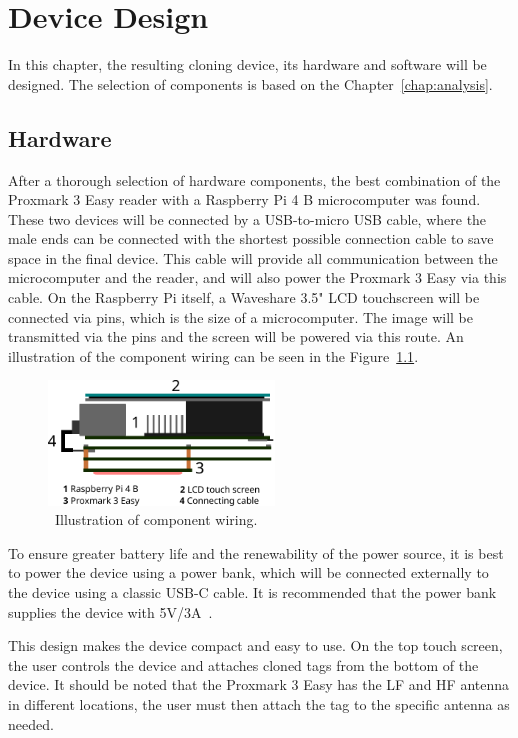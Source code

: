 \chapter{Device Design}
\label{chap:design}


In this chapter, the resulting cloning device, its hardware and software will be designed. The selection of components is based on the Chapter~\ref{chap:analysis}.

\section{Hardware}

After a thorough selection of hardware components, the best combination of the Proxmark 3 Easy reader with a Raspberry Pi 4 B microcomputer was found. These two devices will be connected by a USB-to-micro USB cable, where the male ends can be connected with the shortest possible connection cable to save space in the final device. This cable will provide all communication between the microcomputer and the reader, and will also power the Proxmark 3 Easy via this cable. On the Raspberry Pi itself, a Waveshare 3.5" LCD touchscreen will be connected via pins, which is the size of a microcomputer. The image will be transmitted via the pins and the screen will be powered via this route. An illustration of the component wiring can be seen in the Figure~\ref{fig:devicescheme}. 


\begin{figure}[ht]
  \centering
  \includegraphics[width=6cm]{text/device_scheme.pdf}
  \caption[Illustration of component wiring.]{~Illustration of component wiring.}
  \label{fig:devicescheme}
\end{figure}

To ensure greater battery life and the renewability of the power source, it is best to power the device using a power bank, which will be connected externally to the device using a classic USB-C cable. It is recommended that the power bank supplies the device with 5V/3A~\cite{raspberrydoc}.

This design makes the device compact and easy to use. On the top touch screen, the user controls the device and attaches cloned tags from the bottom of the device. It should be noted that the Proxmark 3 Easy has the LF and HF antenna in different locations, the user must then attach the tag to the specific antenna as needed.

